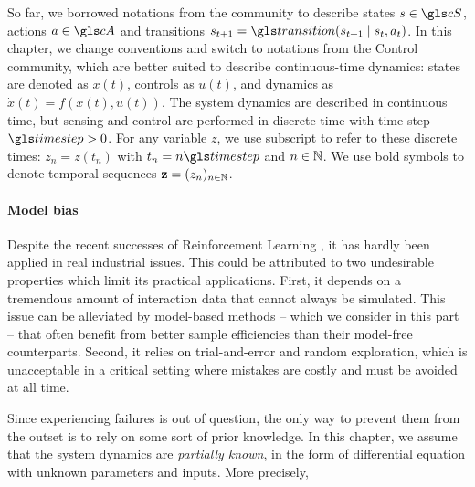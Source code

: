 \begin{remark}
\begin{leftbar}[remarkbar]
So far, we borrowed notations from the  community to describe states $s\in \cS$, actions $a\in\cA$ and transitions $s_{t+1} = \Ps\parentheses{s_{t+1}\mid s_t,a_t}$. In this chapter, we change conventions and switch to notations from the Control community, which are better suited to describe continuous-time dynamics: states are denoted as $x(t)$, controls as $u(t)$, and dynamics as $\dot{x}(t) = f(x(t), u(t))$. 
The system dynamics are described in continuous time, but sensing and control are performed in discrete time with time-step $\timestep>0$. For any variable $z$, we use subscript to refer to these discrete times: $z_n = z(t_n)$ with $t_n = n\timestep$ and $n\in\mathbb{N}$. We use bold symbols to denote temporal sequences $\mathbf{z} = (z_n)_{n\in\mathbb{N}}$.
\end{leftbar}
\end{remark}

\paragraph{Model bias}
Despite the recent successes of Reinforcement Learning \citep[\eg][]{Mnih2015humanlevel,Silver2018}, it has hardly been applied in real industrial issues. This could be attributed to two undesirable properties which limit its practical applications. First, it depends on a tremendous amount of interaction data that cannot always be simulated. This issue can be alleviated by model-based methods -- which we consider in this part -- that often benefit from better sample efficiencies than their model-free counterparts. Second, it relies on trial-and-error and random exploration, which is unacceptable in a critical setting where mistakes are costly and must be avoided at all time.

Since experiencing failures is out of question, the only way to prevent them from the outset is to rely on some sort of prior knowledge. In this chapter, we assume that the system dynamics are \emph{partially known}, in the form of differential equation with unknown parameters and inputs. More precisely,

